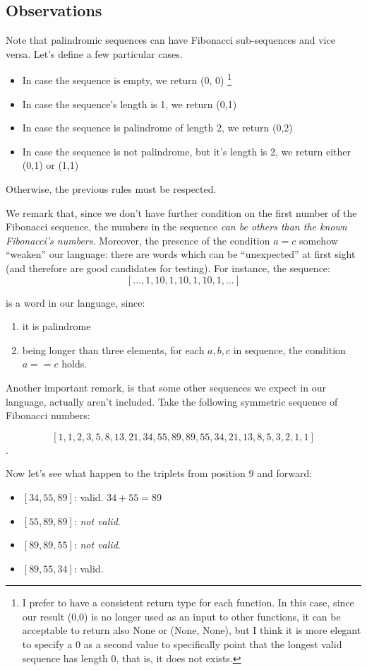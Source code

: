 \documentclass[12pt]{article}
\begin{document}
\subsection{Observations}
Note that palindromic sequences can have Fibonacci sub-sequences and vice versa. 
Let's define a few particular cases.
\begin{itemize}
\item In case the sequence is empty, we return (0, 0) \footnote{I prefer to have a consistent return type for each function. In this case, since our result (0,0) is no longer used as an input to other functions, it can be acceptable to return also None or (None, None), but I think it is more elegant to specify a $0$ as a second value to specifically point that the longest valid sequence has length 0, that is, it does not exists. }
\item In case the sequence's length is 1, we return (0,1)
\item In case the sequence is palindrome of length 2, we return (0,2)
\item In case the sequence is not palindrome, but it's length is 2, we return either (0,1) or (1,1)
\end{itemize}
Otherwise, the previous rules must be respected. 

We remark that, since we don't have further condition on the first number of the Fibonacci sequence, the numbers in the sequence \emph{can be others than the known Fibonacci's numbers}. Moreover, the presence of the condition $a=c$ somehow ``weaken'' our language: there are words which can be ``unexpected'' at first sight (and therefore are good candidates for testing).  For instance, the sequence:
 $$[..., 1,10,1,10,1,10,1, ... ] $$
 
is a word in our language, since:
\begin{enumerate}
\item it is palindrome
\item being longer than three elements, for each $a,b,c$ in sequence, the condition $a == c$ holds.
\end{enumerate}

Another important remark, is that some other sequences we expect in our language, actually aren't included. 
Take the following symmetric sequence of Fibonacci numbers:

$$ [1, 1, 2, 3, 5, 8, 13, 21, 34, 55, 89, 89, 55, 34, 21, 13, 8, 5, 3, 2, 1, 1] $$.

Now let's see what happen to the triplets from position $9$ and forward:
\begin{itemize}
\item $[34, 55, 89]$: valid. $34+55=89$
\item $[55, 89, 89]$: \emph{not valid}. 
\item $[89, 89, 55]$: \emph{not valid}.
\item $[89, 55, 34]$: valid. 
\end{itemize}
\end{document}
